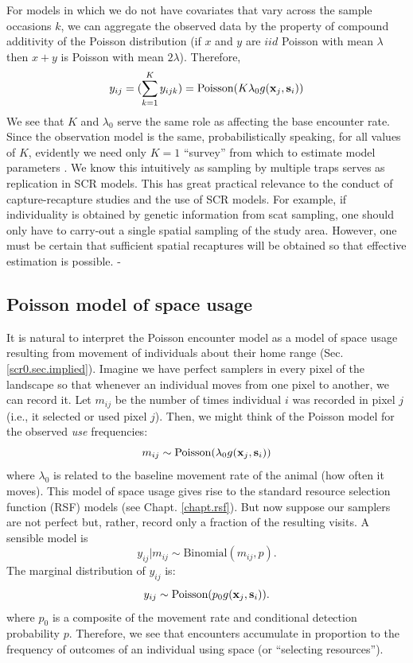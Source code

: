 For models in which we do not have covariates that vary across the
sample occasions $k$, we can aggregate the observed data by the
property of compound additivity of the Poisson distribution (if $x$
and $y$ are $iid$ Poisson with mean $\lambda$ then $x+y$ is Poisson
with mean $2\lambda$). Therefore,
\[
y_{ij} = (\sum_{k=1}^{K} y_{ijk}) =  \mbox{Poisson}(K  \lambda_{0}
g({\bf x}_{j},{\bf s}_{i}) )
\]
We see that $K$ and $\lambda_{0}$ serve the same role as affecting the
base encounter rate. Since the observation model is the same,
probabilistically speaking, for all values of $K$, evidently we need
only $K=1$ ``survey'' from which to estimate model parameters
\citep{efford_etal:2009ecol}. We know this intuitively as sampling by
multiple traps serves as replication in SCR models.  This has great
practical relevance to the conduct of capture-recapture studies and
the use of SCR models. For example, if individuality is obtained by
genetic information from scat sampling, one should only have to
carry-out a single spatial sampling of the study area. However, one
must be certain that sufficient spatial recaptures will be obtained
so that effective estimation is possible. 
-%

\subsection{Poisson model of space usage}

It is natural to interpret the Poisson encounter model as a model of
space usage resulting from movement of individuals about their home
range (Sec. \ref{scr0.sec.implied}).  Imagine we have
perfect samplers in every pixel of the landscape so that whenever an
individual moves from one pixel to another, we can record it.  Let
$m_{ij}$ be the number of times individual $i$ was recorded in pixel
$j$ (i.e., it selected or used pixel $j$). Then, we might think of the
Poisson model for the observed {\it use} frequencies:
\[
m_{ij} \sim  \mbox{Poisson}( \lambda_{0} g({\bf x}_{j},{\bf s}_{i}) )
\]
where $\lambda_{0}$ is related to the baseline movement rate of the
animal (how often it moves). This model of space usage gives rise to
the standard resource selection function (RSF) models (see
Chapt. \ref{chapt.rsf}).  But now suppose our samplers are not perfect
but, rather, record only a fraction of the resulting visits. A
sensible model is
\[
 y_{ij}|m_{ij} \sim \mbox{Binomial}(m_{ij}, p).
\]
The marginal distribution of $y_{ij}$ is:
\[
 y_{ij} \sim \mbox{Poisson}(p_{0} g({\bf x}_{j},{\bf s}_{i}) ).
\]
where $p_0$ is a composite of the movement rate and conditional
detection probability $p$. Therefore, we see that encounters
accumulate in proportion to the frequency of outcomes of an individual
using space (or ``selecting resources'').

